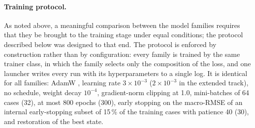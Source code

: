 \paragraph{Training protocol.}
As noted above, a meaningful comparison between the model families requires
that they be brought to the training stage under equal conditions; the protocol
described below was designed to that end.
The protocol is enforced by construction rather than by configuration: every
family is trained by the same trainer class, in which the family selects only the
composition of the loss, and one launcher writes every run with its
hyperparameters to a single log.
It is identical for all families: AdamW \cite{TODO-adamw}, learning rate
$3\times10^{-3}$ ($2\times10^{-3}$ in the extended track), no schedule, weight
decay $10^{-4}$, gradient-norm clipping at 1.0, mini-batches of 64 cases (32),
at most 800 epochs (300), early stopping on the macro-RMSE of an internal
early-stopping subset of 15\,\% of the training cases with patience 40 (30), and %
restoration of the best state.
